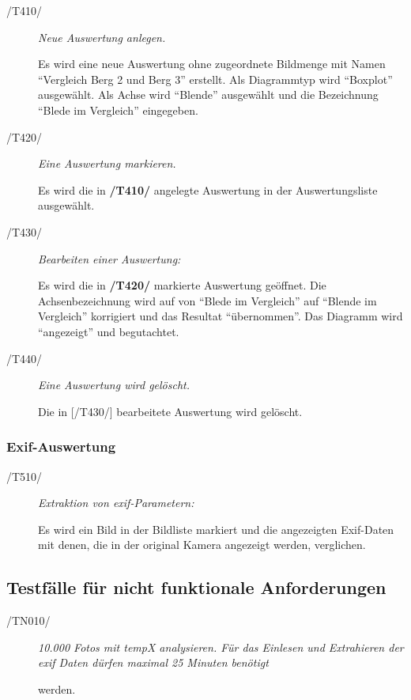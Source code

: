 		\begin{description}
		
			\item[/T410/] \textit{Neue Auswertung anlegen.}\par Es wird eine neue Auswertung ohne zugeordnete Bildmenge mit Namen "`Vergleich Berg 2 und Berg 3"' erstellt. Als Diagrammtyp wird "`Boxplot"' ausgewählt. Als Achse wird "`Blende"' ausgewählt und die Bezeichnung "`Blede im Vergleich"' eingegeben.
			
			\item[/T420/] \textit{Eine Auswertung markieren.}\par Es wird die in \textbf{/T410/} angelegte Auswertung in der Auswertungsliste ausgewählt.
			
			\item[/T430/] \textit{Bearbeiten einer Auswertung:}\par Es wird die in \textbf{/T420/} markierte Auswertung geöffnet. Die Achsenbezeichnung wird auf von "`Blede im Vergleich"' auf "`Blende im Vergleich"' korrigiert und das Resultat "`übernommen"'. Das Diagramm wird "`angezeigt"' und begutachtet.
				
			\item[/T440/] \textit{Eine Auswertung wird gelöscht.}\par Die in [/T430/] bearbeitete Auswertung wird gelöscht.
							
		\end{description}
	
	\subsubsection{Exif-Auswertung}
	
		\begin{description}

			\item[/T510/] \textit{Extraktion von \gls{exif}-Parametern:}\par Es wird ein Bild in der Bildliste markiert und die angezeigten Exif-Daten mit denen, die in der original Kamera angezeigt werden, verglichen.
			

		\end{description}
		
\subsection{Testfälle für nicht funktionale Anforderungen}
	
	\begin{description}
		
			\item[/TN010/]\textit{10.000 Fotos mit \gls{tempX} analysieren. Für das Einlesen und Extrahieren der \gls{exif} Daten dürfen maximal 25 Minuten benötigt}\par werden.
	
	\end{description}